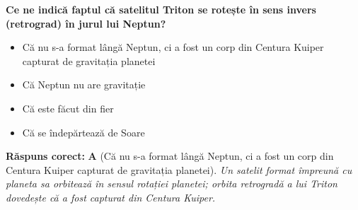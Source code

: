 \vspace{6pt}
\begin{tcolorbox}[orbitarquiz, title={\textbf{Întrebare de verificare \#31: Triton}}]
\textbf{Ce ne indică faptul că satelitul Triton se rotește în sens invers (retrograd) în jurul lui Neptun?}
\begin{itemize}[leftmargin=2.2em, itemsep=2pt, topsep=4pt]
  \item[$\square$ \textbf{A.}] Că nu s-a format lângă Neptun, ci a fost un corp din Centura Kuiper capturat de gravitația planetei
  \item[$\square$ \textbf{B.}] Că Neptun nu are gravitație
  \item[$\square$ \textbf{C.}] Că este făcut din fier
  \item[$\square$ \textbf{D.}] Că se îndepărtează de Soare
\end{itemize}
\vspace{2pt}
{\footnotesize\color{orbitarMuted}\textbf{Răspuns corect:} \textbf{A} (Că nu s-a format lângă Neptun, ci a fost un corp din Centura Kuiper capturat de gravitația planetei). \emph{Un satelit format împreună cu planeta sa orbitează în sensul rotației planetei; orbita retrogradă a lui Triton dovedește că a fost capturat din Centura Kuiper.}}
\end{tcolorbox}
\clearpage

